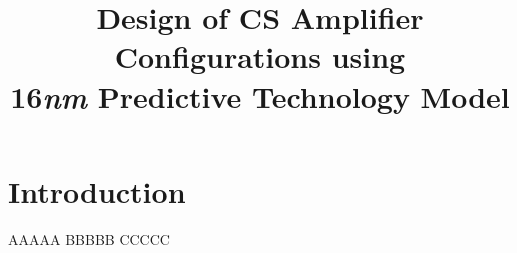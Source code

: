 \documentclass[conference]{IEEEtran}
\begin{document}
\title{Design of CS Amplifier Configurations using \\16\textit{nm} Predictive Technology Model}

\author{
}

\maketitle

\begin{abstract}

\end{abstract}

\begin{IEEEkeywords}

\end{IEEEkeywords}

\section{Introduction}


\begin{thebibliography}{00}

 AAAAA
 BBBBB
 CCCCC

\end{thebibliography}
\end{document}

